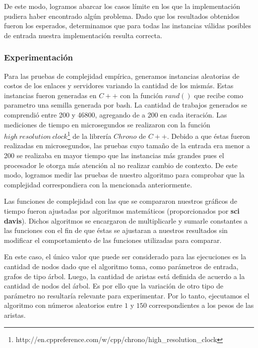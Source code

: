 De este modo, logramos abarcar los casos límite en los que la implementación pudiera haber encontrado algún problema. Dado que los resultados obtenidos fueron los esperados, determinamos que para todas las instancias válidas posibles de entrada nuestra implementación resulta correcta.

\subsubsection{Experimentación}

Para las pruebas de complejidad empírica, generamos instancias aleatorias de costos de los enlaces y servidores variando la cantidad de los mismás. Estas instancias fueron generadas en $C++$ con la función $rand()$ que recibe como parametro una semilla generada por bash. La cantidad de trabajos generados se comprendió entre 200 y 46800, agregando de a 200 en cada iteración. Las mediciones de tiempo en microsegundos se realizaron con la función $high\ resolution\ clock$\footnote{http://en.cppreference.com/w/cpp/chrono/high\_resolution\_clock} de la librería $Chrono$ de $C++$. Debido a que éstas fueron realizadas en microsegundos, las pruebas cuyo tamaño de la entrada era menor a 200 se realizaba en mayor tiempo que las instancias más grandes pues el procesador le otorga más atención al no realizar cambio de contexto. De este modo, logramos medir las pruebas de nuestro algoritmo para comprobar que la complejidad correspondiera con la mencionada anteriormente.

Las funciones de complejidad con las que se compararon nuestros gráficos de tiempo fueron ajustadas por algoritmos matemáticos (proporcionados por \textbf{sci davis}). Dichos algoritmos se encargaron de multiplicarle y sumarle constantes a las funciones con el fin de que éstas se ajustaran a nuestros resultados sin modificar el comportamiento de las funciones utilizadas para comparar.

En este caso, el único valor que puede ser considerado para las ejecuciones es la cantidad de nodos dado que el algoritmo toma, como parámetros de entrada, grafos de tipo árbol. Luego, la cantidad de aristas está definida de acuerdo a la cantidad de nodos del árbol. Es por ello que la variación de otro tipo de parámetro no resultaría relevante para experimentar. Por lo tanto, ejecutamos el algoritmo con números aleatorios entre $1$ y $150$ correspondientes a los pesos de las aristas.

